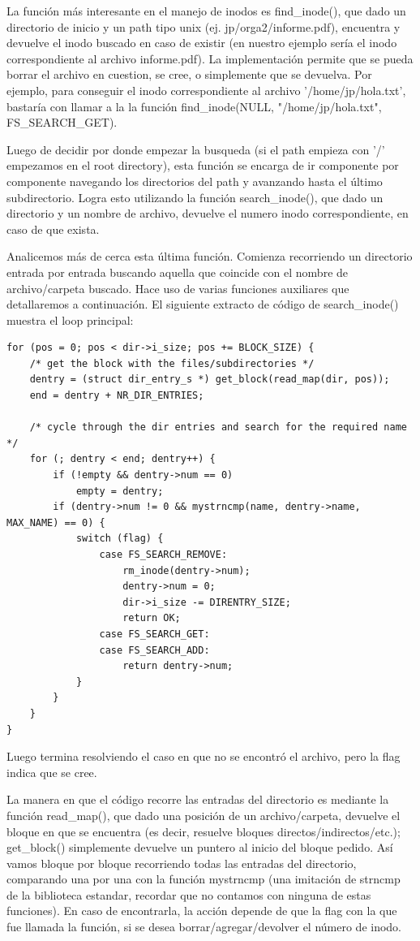 La función más interesante en el manejo de inodos es find\_inode(), que dado un
directorio de inicio y un path tipo unix (ej. jp/orga2/informe.pdf), encuentra y
devuelve el inodo buscado en caso de existir (en nuestro ejemplo sería el inodo
correspondiente al archivo informe.pdf). La implementación permite que se pueda
borrar el archivo en cuestion, se cree, o simplemente que se devuelva. Por
ejemplo, para conseguir el inodo correspondiente al archivo '/home/jp/hola.txt',
bastaría con llamar a la la función find\_inode(NULL, "/home/jp/hola.txt",
FS\_SEARCH\_GET).

Luego de decidir por donde empezar la busqueda (si el path empieza con '/'
empezamos en el root directory), esta función se encarga de ir componente por
componente navegando los directorios del path y avanzando hasta el último
subdirectorio. Logra esto utilizando la función search\_inode(), que dado un
directorio y un nombre de archivo, devuelve el numero inodo correspondiente, en
caso de que exista.

Analicemos más de cerca esta última función. Comienza recorriendo un
directorio entrada por entrada buscando aquella que coincide con el nombre de
archivo/carpeta buscado. Hace uso de varias funciones auxiliares que
detallaremos a continuación. El siguiente extracto de código de search\_inode()
muestra el loop principal:

\begin{verbatim}
for (pos = 0; pos < dir->i_size; pos += BLOCK_SIZE) {
    /* get the block with the files/subdirectories */
    dentry = (struct dir_entry_s *) get_block(read_map(dir, pos));
    end = dentry + NR_DIR_ENTRIES;

    /* cycle through the dir entries and search for the required name */
    for (; dentry < end; dentry++) {
        if (!empty && dentry->num == 0)
            empty = dentry;
        if (dentry->num != 0 && mystrncmp(name, dentry->name, MAX_NAME) == 0) {
            switch (flag) {
                case FS_SEARCH_REMOVE:
                    rm_inode(dentry->num);
                    dentry->num = 0;
                    dir->i_size -= DIRENTRY_SIZE;
                    return OK;
                case FS_SEARCH_GET:
                case FS_SEARCH_ADD:
                    return dentry->num;
            }
        }
    }
}
\end{verbatim}

Luego termina resolviendo el caso en que no se encontró el archivo, pero la flag
indica que se cree.

La manera en que el código recorre las entradas del directorio es mediante la
función read\_map(), que dado una posición de un archivo/carpeta, devuelve el
bloque en que se encuentra (es decir, resuelve bloques
directos/indirectos/etc.); get\_block() simplemente devuelve
un puntero al inicio del bloque pedido. Así vamos bloque por bloque recorriendo
todas las entradas del directorio, comparando una por una con la función
mystrncmp (una imitación de strncmp de la biblioteca estandar, recordar que no
contamos con ninguna de estas funciones). En caso de encontrarla, la acción
depende de que la flag con la que fue llamada la función, si se desea
borrar/agregar/devolver el número de inodo.

